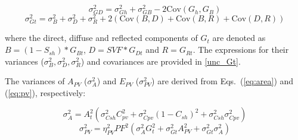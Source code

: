 \begin{equation}
\label{eq:unc_GD}
\sigma^2_{GD} = \sigma^2_{Gh} +  \sigma^2_{GB} - 2 \mathrm{Cov}(G_h, G_B) 
\end{equation}
%
\begin{equation}
\label{eq:irrad_unc}
\sigma^2_{Gt} = \sigma^2_{B} +  \sigma^2_{D} +  \sigma^2_{R} + 2 (\mathrm{Cov}(B, D) + \mathrm{Cov}(B, R) + \mathrm{Cov}(D, R))
\end{equation}

where the direct, diffuse and reflected components of $G_t$ are denoted as $B=(1 - S_{sh}) * G_{Bt}$, $D=\mathit{SVF} * G_{Dt}$ and $R=G_{Rt}$. The expressions for their variances ($\sigma^2_{B}, \sigma^2_{D}, \sigma^2_{R}$) and covariances are provided in \ref{unc_Gt}. 

The variances of $A_{PV}$ ($\sigma^2_A$) and $E_{PV}$ ($\sigma^2_{PV}$) are derived from Eqs.~(\ref{eq:area}) and (\ref{eq:pv}), respectively:

\begin{equation}
\label{eq:area_unc}
\sigma^2_{A}  = A_{t}^2 (\sigma^2_{\mathit{Csh}} C_{\mathit{pv}}^2 + \sigma^2_{\mathit{Cpv}} (1-C_{sh})^2 + \sigma^2_{\mathit{Csh}} \sigma^2_{\mathit{Cpv}}) 
\end{equation}
%
\begin{equation}
\label{eq:pv_unc}
\sigma^2_{PV}  = \eta_{PV}^2 \mathit{PF}^2 (\sigma^2_{A} G_{t}^2 + \sigma^2_{Gt} A_{PV}^2 + \sigma^2_{Gt} \sigma^2_{A}) 
\end{equation}


